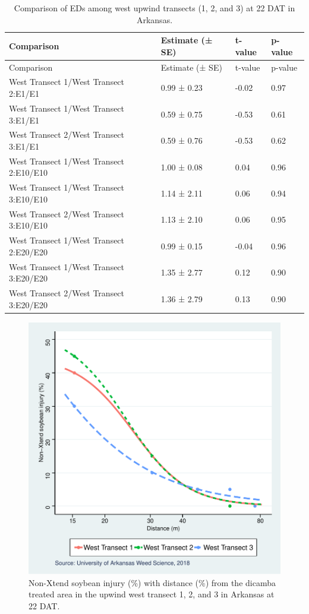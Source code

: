 \documentclass[]{article}
\begin{document}
\begin{longtable}[]{@{}llll@{}}
\caption{Comparison of EDs among west upwind transects (1, 2, and 3) at
22 DAT in Arkansas.}\tabularnewline
\toprule
Comparison & Estimate (± SE) & t-value & p-value\tabularnewline
\midrule
\endfirsthead
\toprule
Comparison & Estimate (± SE) & t-value & p-value\tabularnewline
\midrule
\endhead
West Transect 1/West Transect 2:E1/E1 & 0.99 ± 0.23 & -0.02 &
0.97\tabularnewline
West Transect 1/West Transect 3:E1/E1 & 0.59 ± 0.75 & -0.53 &
0.61\tabularnewline
West Transect 2/West Transect 3:E1/E1 & 0.59 ± 0.76 & -0.53 &
0.62\tabularnewline
West Transect 1/West Transect 2:E10/E10 & 1.00 ± 0.08 & 0.04 &
0.96\tabularnewline
West Transect 1/West Transect 3:E10/E10 & 1.14 ± 2.11 & 0.06 &
0.94\tabularnewline
West Transect 2/West Transect 3:E10/E10 & 1.13 ± 2.10 & 0.06 &
0.95\tabularnewline
West Transect 1/West Transect 2:E20/E20 & 0.99 ± 0.15 & -0.04 &
0.96\tabularnewline
West Transect 1/West Transect 3:E20/E20 & 1.35 ± 2.77 & 0.12 &
0.90\tabularnewline
West Transect 2/West Transect 3:E20/E20 & 1.36 ± 2.79 & 0.13 &
0.90\tabularnewline
\bottomrule
\end{longtable}

\begin{figure}
\centering
\includegraphics{Report_files/figure-latex/unnamed-chunk-12-1.pdf}
\caption{Non-Xtend soybean injury (\%) with distance (\%) from the
dicamba treated area in the upwind west transect 1, 2, and 3 in Arkansas
at 22 DAT.}
\end{figure}
\end{document}
